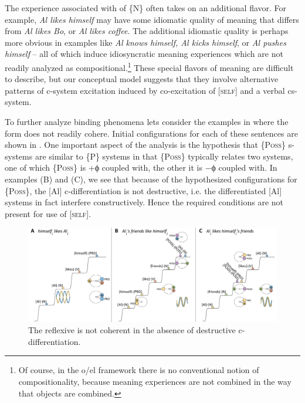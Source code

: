   The  experience associated with  of \{N\} often takes on an additional flavor. For example, \textit{Al likes himself} may have some idiomatic quality of meaning that differs from \textit{Al likes Bo}, or \textit{Al likes coffee}. The additional idiomatic quality is perhaps more obvious in examples like \textit{Al knows himself, Al kicks himself}, or \textit{Al pushes himself} -- all of which induce idiosyncratic meaning experiences which are not readily analyzed as compositional.\footnote{Of course, in the o/el framework there is no conventional notion of compositionality, because meaning experiences are not combined in the way that objects are combined.} These special flavors of meaning are difficult to describe, but our conceptual model suggests that they involve alternative patterns of c-system excitation induced by co-excitation of  [\textsc{self}] and a verbal cs-system.

  To further analyze binding phenomena lets consider the examples in \linebreak where the  form does not readily cohere. Initial configurations for each of these sentences are shown in {}. One important aspect of the analysis is the hypothesis that \{P\textsc{oss}\} s-systems are similar to \{P\} systems in that \{P\textsc{oss}\} typically relates two systems, one of which \{P\textsc{oss}\} is +ϕ coupled with, the other it is −ϕ coupled with. In examples (B) and (C), we see that because of the hypothesized configurations for \{P\textsc{oss}\}, the [Al] c-dif\-fer\-en\-ti\-a\-tion is not destructive, i.e. the differentiated [Al] systems in fact interfere constructively. Hence the required conditions are not present for use of [\textsc{self}]. 

\ea\label{ex:7:16}
\z
\z

\begin{figure}
\includegraphics[width=\textwidth]{figures/Tilsen-img157.png}
\caption{The reflexive is not coherent in the absence of destructive c-dif\-fer\-en\-ti\-a\-tion.}
\label{fig:7:13}
\end{figure}
 

